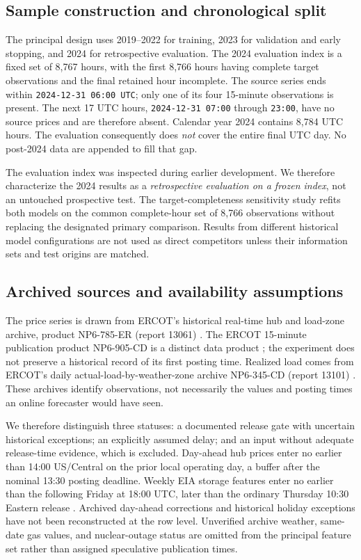 \documentclass[11pt,letterpaper]{article}
\begin{document}
\subsection{Sample construction and chronological split}
The principal design uses 2019--2022 for training, 2023 for validation and early stopping, and 2024 for retrospective evaluation. The 2024 evaluation index is a fixed set of 8,767 hours, with the first 8,766 hours having complete target observations and the final retained hour incomplete. The source series ends within \texttt{2024-12-31 06:00 UTC}; only one of its four 15-minute observations is present. The next 17 UTC hours, \texttt{2024-12-31 07:00} through \texttt{23:00}, have no source prices and are therefore absent. Calendar year 2024 contains 8,784 UTC hours. The evaluation consequently does \emph{not} cover the entire final UTC day. No post-2024 data are appended to fill that gap.

The evaluation index was inspected during earlier development. We therefore characterize the 2024 results as a \emph{retrospective evaluation on a frozen index}, not an untouched prospective test. The target-completeness sensitivity study refits both models on the common complete-hour set of 8,766 observations without replacing the designated primary comparison. Results from different historical model configurations are not used as direct competitors unless their information sets and test origins are matched.

\subsection{Archived sources and availability assumptions}
The price series is drawn from ERCOT's historical real-time hub and load-zone archive, product NP6-785-ER (report 13061) \citep{ercotarchive}. The ERCOT 15-minute publication product NP6-905-CD is a distinct data product \citep{ercotlive}; the experiment does not preserve a historical record of its first posting time. Realized load comes from ERCOT's daily actual-load-by-weather-zone archive NP6-345-CD (report 13101) \citep{ercotload}. These archives identify observations, not necessarily the values and posting times an online forecaster would have seen.

We therefore distinguish three statuses: a documented release gate with uncertain historical exceptions; an explicitly assumed delay; and an input without adequate release-time evidence, which is excluded. Day-ahead hub prices enter no earlier than 14:00 US/Central on the prior local operating day, a buffer after the nominal 13:30 posting deadline. Weekly EIA storage features enter no earlier than the following Friday at 18:00 UTC, later than the ordinary Thursday 10:30 Eastern release \citep{eiaschedule,eiaexplainer}. Archived day-ahead corrections and historical holiday exceptions have not been reconstructed at the row level. Unverified archive weather, same-date gas values, and nuclear-outage status are omitted from the principal feature set rather than assigned speculative publication times.
\end{document}

